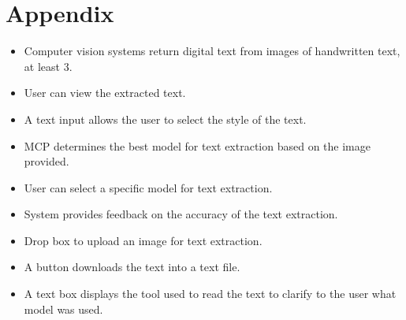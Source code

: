 \documentclass[12pt]{article}
\begin{document}
\section*{Appendix}
\begin{itemize}
	\item Computer vision systems return digital text from images of handwritten text, at least 3.
	\item User can view the extracted text.
	\item A text input allows the user to select the style of the text.
	\item MCP determines the best model for text extraction based on the image provided.
	\item User can select a specific model for text extraction.
	\item System provides feedback on the accuracy of the text extraction.
	\item Drop box to upload an image for text extraction.
	\item A button downloads the text into a text file.
	\item A text box displays the tool used to read the text to clarify to the user what model was used.
\end{itemize}




\end{document}
